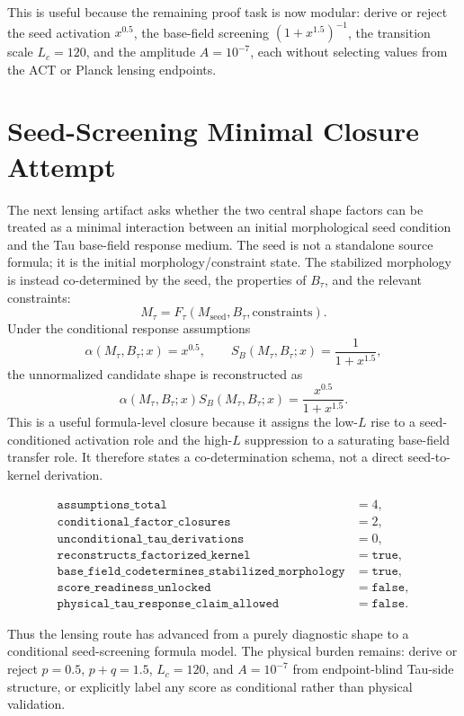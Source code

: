 \documentclass[11pt]{article}
\begin{document}
This is useful because the remaining proof task is now modular: derive or
reject the seed activation \(x^{0.5}\), the base-field screening
\((1+x^{1.5})^{-1}\), the transition scale \(L_c=120\), and the amplitude
\(A=10^{-7}\), each without selecting values from the ACT or Planck lensing
endpoints.

\section{Seed-Screening Minimal Closure Attempt}

The next lensing artifact asks whether the two central shape factors can be
treated as a minimal interaction between an initial morphological seed
condition and the Tau base-field response medium. The seed is not a standalone
source formula; it is the initial morphology/constraint state. The stabilized
morphology is instead co-determined by the seed, the properties of
\(B_\tau\), and the relevant constraints:
\[
M_\tau = F_\tau(M_{\mathrm{seed}},B_\tau,\mathrm{constraints}).
\]
Under the conditional response assumptions
\[
\alpha(M_\tau,B_\tau;x)=x^{0.5},
\qquad
S_B(M_\tau,B_\tau;x)=\frac{1}{1+x^{1.5}},
\]
the unnormalized candidate shape is reconstructed as
\[
\alpha(M_\tau,B_\tau;x)S_B(M_\tau,B_\tau;x)
=\frac{x^{0.5}}{1+x^{1.5}}.
\]
This is a useful formula-level closure because it assigns the low-\(L\)
rise to a seed-conditioned activation role and the high-\(L\) suppression to
a saturating base-field transfer role. It therefore states a co-determination
schema, not a direct seed-to-kernel derivation.

\[
\begin{array}{ll}
\texttt{assumptions\_total} &= 4,\\
\texttt{conditional\_factor\_closures} &= 2,\\
\texttt{unconditional\_tau\_derivations} &= 0,\\
\texttt{reconstructs\_factorized\_kernel} &= \texttt{true},\\
\texttt{base\_field\_codetermines\_stabilized\_morphology} &= \texttt{true},\\
\texttt{score\_readiness\_unlocked} &= \texttt{false},\\
\texttt{physical\_tau\_response\_claim\_allowed} &= \texttt{false}.
\end{array}
\]

Thus the lensing route has advanced from a purely diagnostic shape to a
conditional seed-screening formula model. The physical burden remains: derive
or reject \(p=0.5\), \(p+q=1.5\), \(L_c=120\), and \(A=10^{-7}\) from
endpoint-blind Tau-side structure, or explicitly label any score as
conditional rather than physical validation.
\end{document}
